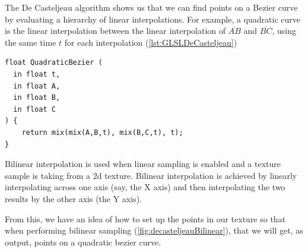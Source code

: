 \documentclass{jcgt}
\begin{document}
The De Casteljeau algorithm shows us that we can find points on a Bezier curve by evaluating a hierarchy of linear interpolations.  For example, a quadratic curve is the linear interpolation between the linear interpolation of {$\overline{AB}$} and {$\overline{BC}$}, using the same time $t$ for each interpolation (\autoref{lst:GLSLDeCasteljeau})

\begin{lstlisting}[caption={GLSL De Casteljeau Algorithm For a Quadratic Bezier Curve}, label={lst:GLSLDeCasteljeau}]
float QuadraticBezier (
  in float t,
  in float A,
  in float B,
  in float C
) {
    return mix(mix(A,B,t), mix(B,C,t), t);
}
\end{lstlisting}

Bilinear interpolation is used when linear sampling is enabled and a texture sample is taking from a 2d texture.  Bilinear interpolation is achieved by linearly interpolating across one axis (say, the X axis) and then interpolating the two results by the other axis (the Y axis).

From this, we have an idea of how to set up the points in our texture so that when performing bilinear sampling (\autoref{fig:decasteljeauBilinear}), that we will get, as output, points on a quadratic bezier curve.
\end{document}
